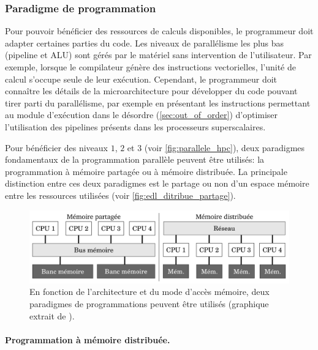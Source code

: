     \subsubsection{Paradigme de programmation}
       
        Pour pouvoir bénéficier des ressources de calculs disponibles, le programmeur doit adapter certaines parties du code. Les niveaux de parallélisme les plus bas (pipeline et ALU) sont gérés par le matériel sans intervention de l'utilisateur. Par exemple, lorsque le compilateur génère des instructions vectorielles, l'unité de calcul s'occupe seule de leur exécution. Cependant, le programmeur doit connaître les détails de la microarchitecture pour développer du code pouvant tirer parti du parallélisme, par exemple en présentant les instructions permettant au module d'exécution dans le désordre (\autoref{sec:out_of_order}) d'optimiser l'utilisation des pipelines présents dans les processeurs superscalaires.
        
        Pour bénéficier des niveaux $1$, $2$ et $3$ (voir \autoref{fig:parallele_hpc}), deux paradigmes fondamentaux de la programmation parallèle peuvent être utilisés: la programmation à mémoire partagée ou à mémoire distribuée. La principale distinction entre ces deux paradigmes est le partage ou non d'un espace mémoire entre les ressources utilisées (voir \autoref{fig:edl_ditribue_partage}). 
        
            \begin{figure}
                \center
                \includegraphics[width=14cm]{images/edl_ditribue_partage.png}
                \caption{\label{fig:edl_ditribue_partage} En fonction de l'architecture et du mode d'accès mémoire, deux paradigmes de programmations peuvent être utilisés (graphique extrait de \cite{Valat2016}).}
            \end{figure}
        
        
        
            
        \paragraph{Programmation à mémoire distribuée.}  
               

